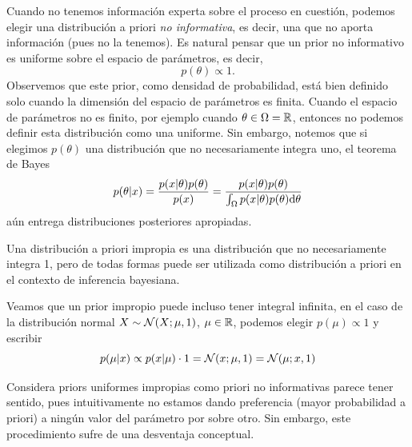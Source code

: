 Cuando no tenemos información experta sobre el proceso en cuestión, podemos elegir una distribución a priori \textit{no informativa}, es decir, una que no aporta información (pues no la tenemos). Es natural pensar que un prior no informativo es uniforme sobre el espacio de parámetros, es decir, 
\begin{equation}
	p(\theta)\propto 1.
\end{equation}
Observemos que este prior, como densidad de probabilidad, está bien definido solo cuando la dimensión del espacio de parámetros es finita. Cuando el espacio de parámetros no es finito, por ejemplo cuando $\theta\in\Omega={\mathbb R}$, entonces no podemos definir esta distribución como una uniforme. Sin embargo, notemos que si elegimos $p(\theta)$ una distribución que no necesariamente integra uno, el teorema de Bayes
\begin{equation}
	p(\theta|x) = \frac{p(x|\theta)p(\theta)}{p(x)} = \frac{p(x|\theta)p(\theta)}{\int_\Omega p(x|\theta)p(\theta){\text{d}}\theta}
\end{equation}
aún entrega distribuciones posteriores apropiadas. 

\begin{definition} Una distribución a priori impropia es una distribución que no necesariamente integra 1, pero de todas formas puede ser utilizada como distribución a priori en el contexto de inferencia bayesiana. 
\end{definition}

\begin{remark} Veamos que un prior impropio puede incluso tener integral infinita, en el caso de la distribución normal $X\sim{\mathcal N}(X;\mu,1)$,  $\mu\in{\mathbb R}$, podemos elegir $p(\mu)\propto1$ y escribir 
\begin{equation}
	p(\mu|x)\propto p(x|\mu)\cdot 1 = {\mathcal N}(x;\mu,1) = {\mathcal N}(\mu;x,1) 
\end{equation}
	
\end{remark}

Considera priors uniformes impropias como priori no informativas parece tener sentido, pues intuitivamente no estamos dando preferencia (mayor probabilidad a priori) a ningún valor del parámetro por sobre otro. Sin embargo, este procedimiento sufre de una desventaja conceptual.


